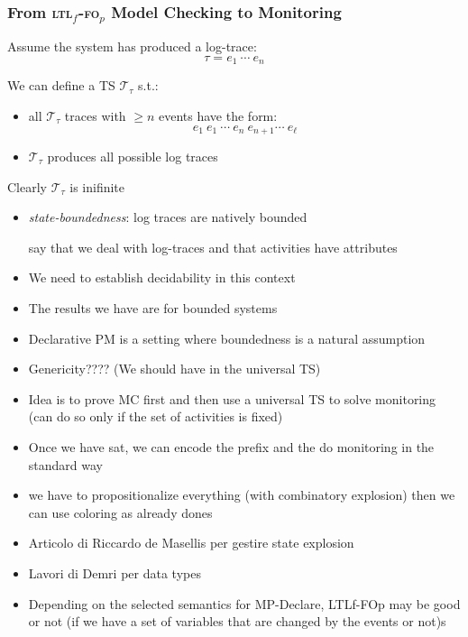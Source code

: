 \documentclass{beamer}
\newcommand{\T}{\mathcal T\xspace}
\newcommand{\ltlf}{\textsc{ltl}$_f$\xspace}
\newcommand{\ltlffop}{\ltlf-\textsc{fo}$_p$\xspace}
\begin{document}
\begin{frame}
\frametitle{From \ltlffop  Model Checking to Monitoring}

Assume the system has produced a log-trace:
$$\tau=e_1~\cdots~e_n$$

We can define a TS $\T_\tau$ s.t.:
\begin{itemize}
	\item all $\T_\tau$ traces with $\geq n$ events have the form:
		\[e_1~e_1~\cdots~e_n~e_{n+1}\cdots~e_\ell\]
	\item $\T_\tau$ produces all possible log traces
\end{itemize}

Clearly $\T_\tau$ is inifinite

\begin{itemize}	
	\item \emph{state-boundedness}: log traces are natively bounded 
	
	
	say that we deal with log-traces and that activities have attributes
	\item We need to establish decidability in this context
\end{itemize}

\begin{itemize}
	\item The results we have are for bounded systems
	\item Declarative PM is a setting where boundedness is a natural assumption
	\item Genericity???? (We should have in the universal TS)
	\item Idea is to prove MC first and then use a universal TS to solve monitoring
		(can do so only if the set of activities is fixed)
	\item Once we have sat, we can encode the prefix and the do monitoring in the standard way
	\item we have to propositionalize everything (with combinatory explosion) then we can use coloring as 
	already dones
	\item Articolo di Riccardo de Masellis per gestire state explosion
	\item Lavori di Demri per data types
	\item Depending on the selected semantics for MP-Declare, LTLf-FOp may be 
		good or not (if we have a set of variables that are changed by the events or not)s
\end{itemize}

\end{frame}

\end{document}
